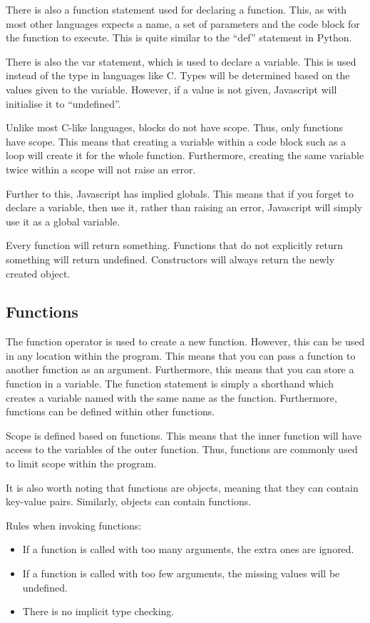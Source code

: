 			There is also a function statement used for declaring a function. 
			This, as with most other languages expects a name, a set of parameters and the code block for the function to execute. 
			This is quite similar to the ``def'' statement in Python. 

			There is also the var statement, which is used to declare a variable. 
			This is used instead of the type in languages like C. 
			Types will be determined based on the values given to the variable.
			However, if a value is not given, Javascript will initialise it to ``undefined''. 

			Unlike most C-like languages, blocks do not have scope. 
			Thus, only functions have scope. 
			This means that creating a variable within a code block such as a loop will create it for the whole function. 
			Furthermore, creating the same variable twice within a scope will not raise an error. 

			Further to this, Javascript has implied globals. 
			This means that if you forget to declare a variable, then use it, 
			rather than raising an error, Javascript will simply use it as a global variable. 

			Every function will return something. 
			Functions that do not explicitly return something will return undefined. 
			Constructors will always return the newly created object. 

		\subsection{Functions}
			The function operator is used to create a new function. 
			However, this can be used in any location within the program. 
			This means that you can pass a function to another function as an argument. 
			Furthermore, this means that you can store a function in a variable.
			The function statement is simply a shorthand which creates a variable named with the same name as the function. 
			Furthermore, functions can be defined within other functions. 

			Scope is defined based on functions. 
			This means that the inner function will have access to the variables of the outer function. 
			Thus, functions are commonly used to limit scope within the program. 

			It is also worth noting that functions are objects, meaning that they can contain key-value pairs. 
			Similarly, objects can contain functions. 

			Rules when invoking functions:
			\begin{itemize}
				\item If a function is called with too many arguments, the extra ones are ignored. 
				\item If a function is called with too few arguments, the missing values will be undefined. 
				\item There is no implicit type checking. 
			\end{itemize}
			

